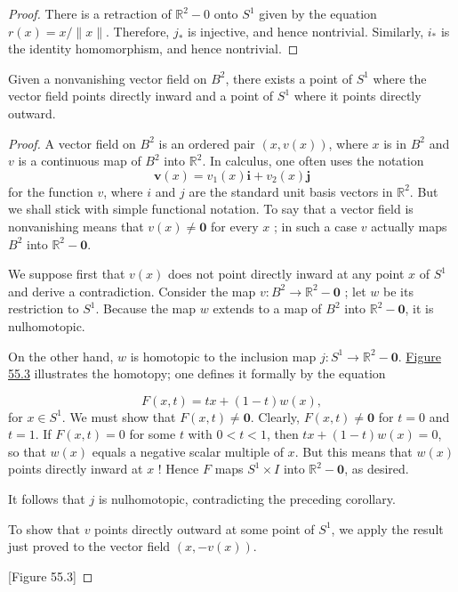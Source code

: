 \begin{proof}
There is a retraction of \(\mathbb{R}^{2} - 0\) onto \(S^{1}\) given by the equation \(r(x) = x/\parallel x\parallel\). Therefore, \(j_{ * }\) is injective, and hence nontrivial. Similarly, \(i_{ * }\) is the identity homomorphism, and hence nontrivial.
\end{proof}
\begin{theorem}
\label{thm:\thetheorem}
Given a nonvanishing vector field on \(B^{2}\), there exists a point of \(S^{1}\) where the vector field points directly inward and a point of \(S^{1}\) where it points directly outward.
\end{theorem}

\begin{proof}
A vector field on \(B^{2}\) is an ordered pair \(( {x,v(x) })\), where \(x\) is in \(B^{2}\) and \(v\) is a continuous map of \(B^{2}\) into \(\mathbb{R}^{2}\). In calculus, one often uses the notation
\[
\mathbf{v}(x) = v_{1}(x) \mathbf{i} + v_{2}(x) \mathbf{j}
\]
for the function \(v\), where \(i\) and \(j\) are the standard unit basis vectors in \(\mathbb{R}^{2}\). But we shall stick with simple functional notation. To say that a vector field is nonvanishing means that \(v(x) \neq \mathbf{0}\) for every \(x\) ; in such a case \(v\) actually maps \(B^{2}\) into \(\mathbb{R}^{2} - \mathbf{0}\).

We suppose first that \(v(x)\) does not point directly inward at any point \(x\) of \(S^{1}\) and derive a contradiction. Consider the map \(v : B^{2} \rightarrow {\mathbb{R}}^{2} - \mathbf{0}\) ; let \(w\) be its restriction to \(S^{1}\). Because the map \(w\) extends to a map of \(B^{2}\) into \(\mathbb{R}^{2} - \mathbf{0}\), it is nulhomotopic.

On the other hand, \(w\) is homotopic to the inclusion map \(j : S^{1} \rightarrow {\mathbb{R}}^{2} - \mathbf{0}\). \hyperref[fig:55.3]{Figure 55.3} illustrates the homotopy; one defines it formally by the equation

\[
F( {x,t}) = {tx} + ( {1 - t}) w(x),
\]
for \(x \in {S}^{1}\). We must show that \(F( {x,t}) \neq \mathbf{0}\). Clearly, \(F( {x,t}) \neq \mathbf{0}\) for \(t = 0\) and \(t = 1\). If \(F( {x,t}) = 0\) for some \(t\) with \(0 < t < 1\), then \({tx} + ( {1 - t}) w(x) = 0\), so that \(w(x)\) equals a negative scalar multiple of \(x\). But this means that \(w(x)\) points directly inward at \(x\) ! Hence \(F\) maps \(S^{1} \times I\) into \(\mathbb{R}^{2} - \mathbf{0}\), as desired.

It follows that \(j\) is nulhomotopic, contradicting the preceding corollary.

To show that \(v\) points directly outward at some point of \(S^{1}\), we apply the result just proved to the vector field \(( {x, - v(x) })\).

[Figure 55.3]
\end{proof}
